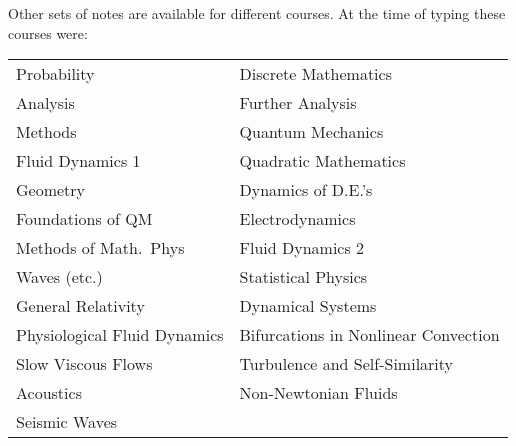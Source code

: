 Other sets of notes are available for different courses.  At the time
of typing these courses were:

\begin{center}
\begin{tabular}{l | l}
Probability & Discrete Mathematics \\
Analysis & Further Analysis \\
Methods & Quantum Mechanics \\
Fluid Dynamics 1 & Quadratic Mathematics \\
Geometry & Dynamics of D.E.'s \\
Foundations of QM & Electrodynamics \\
Methods of Math.\ Phys & Fluid Dynamics 2 \\
Waves (etc.) & Statistical Physics \\
General Relativity & Dynamical Systems \\
Physiological Fluid Dynamics & Bifurcations in Nonlinear Convection \\
Slow Viscous Flows & Turbulence and Self-Similarity \\
Acoustics & Non-Newtonian Fluids \\
Seismic Waves & \\
\end{tabular}
\end{center}
